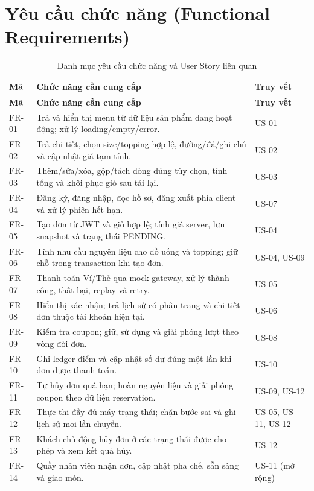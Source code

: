 \section{Yêu cầu chức năng (Functional Requirements)}
\label{sec:functional}
{\small{}
\begin{longtable}{@{}L{0.10\textwidth}L{0.61\textwidth}L{0.22\textwidth}@{}}
\caption{Danh mục yêu cầu chức năng và User Story liên quan}\label{tab:functional}\\
\toprule\textbf{Mã} & \textbf{Chức năng cần cung cấp} & \textbf{Truy vết} \\\midrule\endfirsthead
\toprule\textbf{Mã} & \textbf{Chức năng cần cung cấp} & \textbf{Truy vết} \\\midrule\endhead
\bottomrule\endfoot
FR-01 & Trả và hiển thị menu từ dữ liệu sản phẩm đang hoạt động; xử lý loading/empty/error. & US-01 \\
FR-02 & Trả chi tiết, chọn size/topping hợp lệ, đường/đá/ghi chú và cập nhật giá tạm tính. & US-02 \\
FR-03 & Thêm/sửa/xóa, gộp/tách dòng đúng tùy chọn, tính tổng và khôi phục giỏ sau tải lại. & US-03 \\
FR-04 & Đăng ký, đăng nhập, đọc hồ sơ, đăng xuất phía client và xử lý phiên hết hạn. & US-07 \\
FR-05 & Tạo đơn từ JWT và giỏ hợp lệ; tính giá server, lưu snapshot và trạng thái PENDING. & US-04 \\
FR-06 & Tính nhu cầu nguyên liệu cho đồ uống và topping; giữ chỗ trong transaction khi tạo đơn. & US-04, US-09 \\
FR-07 & Thanh toán Ví/Thẻ qua mock gateway, xử lý thành công, thất bại, replay và retry. & US-05 \\
FR-08 & Hiển thị xác nhận; trả lịch sử có phân trang và chi tiết đơn thuộc tài khoản hiện tại. & US-06 \\
FR-09 & Kiểm tra coupon; giữ, sử dụng và giải phóng lượt theo vòng đời đơn. & US-08 \\
FR-10 & Ghi ledger điểm và cập nhật số dư đúng một lần khi đơn được thanh toán. & US-10 \\
FR-11 & Tự hủy đơn quá hạn; hoàn nguyên liệu và giải phóng coupon theo dữ liệu reservation. & US-09, US-12 \\
FR-12 & Thực thi đầy đủ máy trạng thái; chặn bước sai và ghi lịch sử mọi lần chuyển. & US-05, US-11, US-12 \\
FR-13 & Khách chủ động hủy đơn ở các trạng thái được cho phép và xem kết quả hủy. & US-12 \\
FR-14 & Quầy nhân viên nhận đơn, cập nhật pha chế, sẵn sàng và giao món. & US-11 (mở rộng) \\
\end{longtable}}

